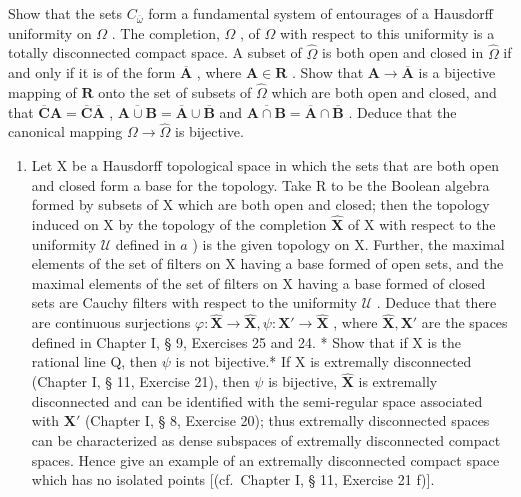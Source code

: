 Show that the sets \(C_{\overline{\omega}}\) form a fundamental system of entourages of a Hausdorff uniformity on \(\Omega\) . The completion, \(\hat{\Omega}\) , of \(\Omega\) with respect to this uniformity is a totally disconnected compact space. A subset of \(\hat{\Omega}\) is both open and closed in \(\hat{\Omega}\) if and only if it is of the form \(\overline{\mathbf{A}}\) , where \(\mathbf{A} \in \mathbf{R}\) . Show that \(\mathbf{A} \to \overline{\mathbf{A}}\) is a bijective mapping of \(\mathbf{R}\) onto the set of subsets of \(\hat{\Omega}\) which are both open and closed, and that \(\overline{\mathbf{C}}\mathbf{A} = \overline{\mathbf{C}}\overline{\mathbf{A}}\) , \(\overline{\mathbf{A} \cup \mathbf{B}} = \overline{\mathbf{A}} \cup \overline{\mathbf{B}}\) and \(\overline{\mathbf{A} \cap \mathbf{B}} = \overline{\mathbf{A}} \cap \overline{\mathbf{B}}\) . Deduce that the canonical mapping \(\Omega \to \hat{\Omega}\) is bijective.

\begin{enumerate}
\def\labelenumi{\alph{enumi})}
\setcounter{enumi}{1}
\tightlist
\item
  Let X be a Hausdorff topological space in which the sets that are both open and closed form a base for the topology. Take R to be the Boolean algebra formed by subsets of X which are both open and closed; then the topology induced on X by the topology of the completion \(\hat{\mathbf{X}}\) of X with respect to the uniformity \(\mathcal{U}\) defined in \(a\) ) is the given topology on X. Further, the maximal elements of the set of filters on X having a base formed of open sets, and the maximal elements of the set of filters on X having a base formed of closed sets are Cauchy filters with respect to the uniformity \(\mathcal{U}\) . Deduce that there are continuous surjections \(\varphi: \hat{\mathbf{X}} \to \hat{\mathbf{X}}, \psi: \mathbf{X}' \to \hat{\mathbf{X}}\) , where \(\hat{\mathbf{X}}, \mathbf{X}'\) are the spaces defined in Chapter I, § 9, Exercises 25 and 24. * Show that if X is the rational line Q, then \(\psi\) is not bijective.* If X is extremally disconnected (Chapter I, § 11, Exercise 21), then \(\psi\) is bijective, \(\hat{\mathbf{X}}\) is extremally disconnected and can be identified with the semi-regular space associated with \(\mathbf{X}'\) (Chapter I, § 8, Exercise 20); thus extremally disconnected spaces can be characterized as dense subspaces of extremally disconnected compact spaces. Hence give an example of an extremally disconnected compact space which has no isolated points {[}(cf.~Chapter I, § 11, Exercise 21 f){]}.
\end{enumerate}

